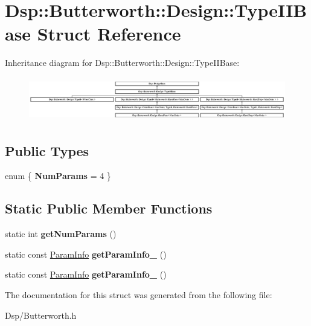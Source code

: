 \hypertarget{structDsp_1_1Butterworth_1_1Design_1_1TypeIIBase}{\section{Dsp\-:\-:Butterworth\-:\-:Design\-:\-:Type\-I\-I\-Base Struct Reference}
\label{structDsp_1_1Butterworth_1_1Design_1_1TypeIIBase}
}
Inheritance diagram for Dsp\-:\-:Butterworth\-:\-:Design\-:\-:Type\-I\-I\-Base\-:\begin{figure}[H]
\begin{center}
\leavevmode
\includegraphics[height=1.924399cm]{structDsp_1_1Butterworth_1_1Design_1_1TypeIIBase}
\end{center}
\end{figure}
\subsection*{Public Types}
\begin{DoxyCompactItemize}
\item 
enum \{ {\bfseries Num\-Params} =  4
 \}
\end{DoxyCompactItemize}
\subsection*{Static Public Member Functions}
\begin{DoxyCompactItemize}
\item 
\hypertarget{structDsp_1_1Butterworth_1_1Design_1_1TypeIIBase_aa36cb7b33c9e75bd47a7d987a2d7dc89}{static int {\bfseries get\-Num\-Params} ()}\label{structDsp_1_1Butterworth_1_1Design_1_1TypeIIBase_aa36cb7b33c9e75bd47a7d987a2d7dc89}

\item 
\hypertarget{structDsp_1_1Butterworth_1_1Design_1_1TypeIIBase_a7f6650a74581c99e4a2845493024b85e}{static const \hyperlink{classDsp_1_1ParamInfo}{Param\-Info} {\bfseries get\-Param\-Info\-\_} ()}\label{structDsp_1_1Butterworth_1_1Design_1_1TypeIIBase_a7f6650a74581c99e4a2845493024b85e}

\item 
\hypertarget{structDsp_1_1Butterworth_1_1Design_1_1TypeIIBase_a97c63c286f43aa256d95f119e87bbdb6}{static const \hyperlink{classDsp_1_1ParamInfo}{Param\-Info} {\bfseries get\-Param\-Info\-\_} ()}\label{structDsp_1_1Butterworth_1_1Design_1_1TypeIIBase_a97c63c286f43aa256d95f119e87bbdb6}

\end{DoxyCompactItemize}


The documentation for this struct was generated from the following file\-:\begin{DoxyCompactItemize}
\item 
Dsp/Butterworth.\-h\end{DoxyCompactItemize}
